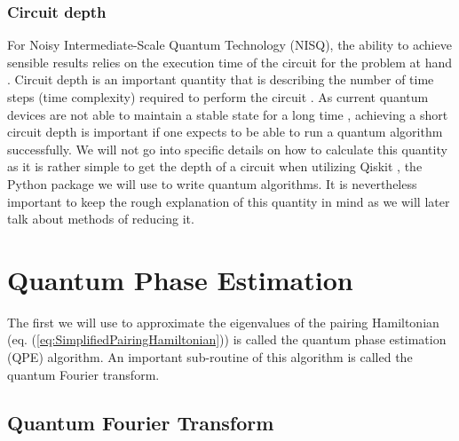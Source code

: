 \subsubsection{Circuit depth}
\label{subsubsec:CircuitDepth}

For Noisy Intermediate-Scale Quantum Technology (NISQ), the ability to achieve sensible results relies on the execution time of the circuit for the problem at hand \cite{circuitdepth}. Circuit depth is an important quantity that is describing the number of time steps (time complexity) required to perform the circuit \cite{circuitdepth}.
As current quantum devices are not able to maintain a stable state for a long time \cite{decoherence}, achieving a short circuit depth is important if one expects to be able to run a quantum algorithm successfully. We will not go into specific details on how to calculate this quantity as it is rather simple to get the depth of a circuit when utilizing Qiskit \cite{qiskit}, the Python package we will use to write quantum algorithms. It is nevertheless important to keep the rough explanation of this quantity in mind as we will later talk about methods of reducing it.

\section{Quantum Phase Estimation}
\label{sec:QPE}
The first we will use to approximate the eigenvalues of the pairing Hamiltonian (eq. (\ref{eq:SimplifiedPairingHamiltonian})) is called the quantum phase estimation (QPE) algorithm. An important sub-routine of this algorithm is called the quantum Fourier transform. 
\subsection{Quantum Fourier Transform}
\label{subsec:QFT}

